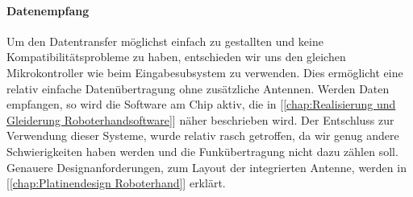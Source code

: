 \documentclass[titlepage,12pt,twoside]{article}
\begin{document}
\paragraph{Datenempfang}
\hfill \break
\hfill \break
Um den Datentransfer möglichst einfach zu gestallten und keine Kompatibilitätsprobleme zu haben, entschieden wir uns den gleichen Mikrokontroller
wie beim Eingabesubsystem zu verwenden. Dies ermöglicht eine relativ einfache Datenübertragung ohne zusätzliche Antennen. Werden Daten empfangen,
so wird die Software am Chip aktiv, die in [\textcolor{blue}{\autoref{chap:Realisierung und Gleiderung Roboterhandsoftware}}] näher beschrieben wird. Der
Entschluss zur Verwendung dieser  Systeme, wurde relativ rasch getroffen, da wir genug andere Schwierigkeiten haben werden und 
die Funkübertragung nicht dazu zählen soll. Genauere Designanforderungen, zum Layout der integrierten Antenne, werden in [\textcolor{blue}{\autoref{chap:Platinendesign Roboterhand}}] erklärt.
\end{document}
